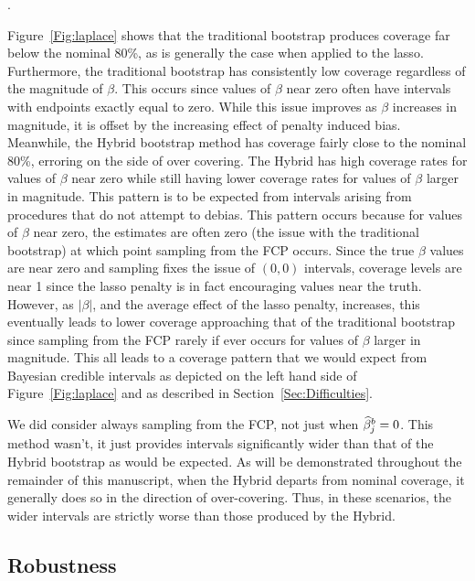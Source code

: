 .

Figure~\ref{Fig:laplace} shows that the traditional bootstrap produces coverage far below the nominal 80\%, as is generally the case when applied to the lasso. Furthermore, the traditional bootstrap has consistently low coverage regardless of the magnitude of $\beta$. This occurs since values of $\beta$ near zero often have intervals with endpoints exactly equal to zero. While this issue improves as $\beta$ increases in magnitude, it is offset by the increasing effect of penalty induced bias. Meanwhile, the Hybrid bootstrap method has coverage fairly close to the nominal 80\%, erroring on the side of over covering. The Hybrid has high coverage rates for values of $\beta$ near zero while still having lower coverage rates for values of $\beta$ larger in magnitude. This pattern is to be expected from intervals arising from procedures that do not attempt to debias. This pattern occurs because for values of $\beta$ near zero, the estimates are often zero (the issue with the traditional bootstrap) at which point sampling from the FCP occurs. Since the true $\beta$ values are near zero and sampling fixes the issue of $(0, 0)$ intervals, coverage levels are near 1 since the lasso penalty is in fact encouraging values near the truth. However, as $|\beta|$, and the average effect of the lasso penalty, increases, this eventually leads to lower coverage approaching that of the traditional bootstrap since sampling from the FCP rarely if ever occurs for values of $\beta$ larger in magnitude. This all leads to a coverage pattern that we would expect from Bayesian credible intervals as depicted on the left hand side of Figure~\ref{Fig:laplace} and as described in Section~\ref{Sec:Difficulties}.

We did consider always sampling from the FCP, not just when $\widehat{\beta}_j^b = 0$. This method wasn't, it just provides intervals significantly wider than that of the Hybrid bootstrap as would be expected. As will be demonstrated throughout the remainder of this manuscript, when the Hybrid departs from nominal coverage, it generally does so in the direction of over-covering. Thus, in these scenarios, the wider intervals are strictly worse than those produced by the Hybrid.

\subsection{Robustness}
\label{Sec:robustness}

